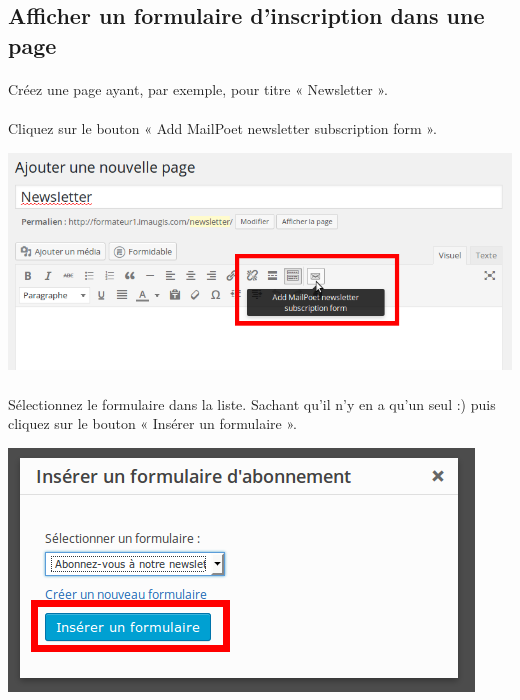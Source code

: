 \documentclass[10pt,a4paper]{article}
\begin{document}
\subsection{Afficher un formulaire d'inscription dans une page}
\paragraph{}Créez une page ayant, par exemple, pour titre « Newsletter ».
\paragraph{}Cliquez sur le bouton « Add MailPoet newsletter subscription form ».
\begin{center}
\includegraphics[scale=0.3]{img/0210.png}
\end{center}
\paragraph{}Sélectionnez le formulaire dans la liste. Sachant qu'il n'y en a qu'un seul :) puis cliquez sur le bouton « Insérer un formulaire ».
\begin{center}
\includegraphics[scale=0.3]{img/0211.png}
\end{center}
\end{document}
